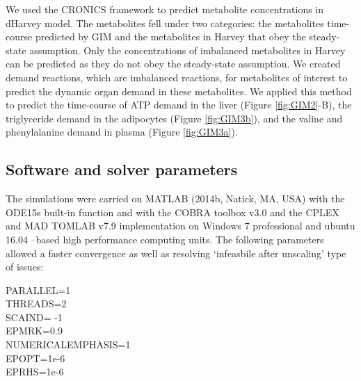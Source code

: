 We used the CRONICS framework to predict metabolite concentrations in dHarvey model. The metabolites fell under two categories: the metabolites time-course predicted by GIM and the metabolites in Harvey that obey the steady-state assumption. Only the concentrations of imbalanced metabolites in Harvey can be predicted as they do not obey the steady-state assumption. We created demand reactions, which are imbalanced reactions, for metabolites of interest to predict the dynamic organ demand in these metabolites. We applied this method to predict the time-course of ATP demand in the liver (Figure \ref{fig:GIM2}-B), the triglyceride demand in the adipocytes (Figure \ref{fig:GIM3b}), and the valine and phenylalanine demand in plasma (Figure \ref{fig:GIM3a}).
\subsection{Software and solver parameters} \label{GIM:sp4}
The simulations were carried on MATLAB (2014b, Natick, MA, USA) with the ODE15s built-in function and with the COBRA toolbox v3.0 \cite{heirendt2017creation}  and the CPLEX and MAD TOMLAB v7.9 implementation on Windows 7 professional and ubuntu 16.04 –based high performance computing units.
The following parameters allowed a faster convergence as well as resolving ‘infeasbile after unscaling’ type of issues:\\
\begin{center}
PARALLEL=1\\
THREADS=2\\
SCAIND= -1\\
EPMRK=0.9 \\
NUMERICALEMPHASIS=1 \\
EPOPT=1e-6 \\
EPRHS=1e-6 \\
\end{center}
